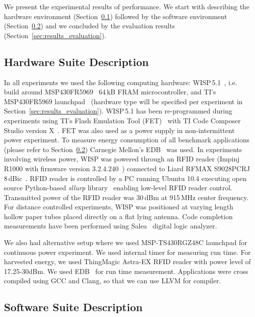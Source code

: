 We present the experimental results of \sys performance. We start with describing the hardware environment (Section~\ref{sec:results_hardware}) followed by the software environment (Section~\ref{sec:results_software}) and we concluded by the evaluation results (Section~\ref{sec:results_evaluation}).

\subsection{Hardware Suite Description}
\label{sec:results_hardware}

In all experiments we used the following computing hardware: WISP\,5.1~\cite{wisp5,wisp}, i.e. build around MSP430FR5969~\cite{wolverine} 64\,kB FRAM microcontroller, and TI's MSP430FR5969 launchpad~\cite{MSP-EXP430FR5969_launchpad} (hardware type will be specified per experiment in Section~\ref{sec:results_evaluation}). WISP\,5.1 has been re-programmed during experiments using TI's Flash Emulation Tool (FET)~\cite{fet} with TI Code Composer Studio version X~\cite{}. FET was also used as a power supply in non-intermittent power experiment. To measure energy consumption of all benchmark applications (please refer to Section~\ref{sec:results_software}) Carnegie Mellon's EDB~\cite{edb} was used. In experiments involving wireless power, WISP was powered through an RFID reader (Impinj R1000 with firmware version 3.2.4.240~\cite{r1000_data_sheet}) connected to Liard RFMAX S9028PCRJ 8\,dBic~\cite{atlas2015}. RFID reader is controlled by a PC running Ubuntu 10.4 executing open source Python-based \emph{sllurp} library~\cite{sllrp_github} enabling low-level RFID reader control. Transmitted power of the RFID reader was 30\,dBm at 915\,MHz center frequency. For distance controlled experiments, WISP was positioned at varying length hollow paper tubes placed directly on a flat lying antenna. Code completion measurements have been performed using Salea~\cite{saleae} digital logic analyzer.

We also had alternative setup where we used MSP-TS430RGZ48C launchpad for continuous power experiment. We used internal timer for measuring run time. For harvested energy, we used ThingMagic Astra-EX RFID reader with power level of 17.25-30dBm. We used EDB~\cite{edb} for run time measurement. Applications were cross compiled using GCC and Clang, so that we can use LLVM for \sys compiler.

\subsection{Software Suite Description}
\label{sec:results_software}

